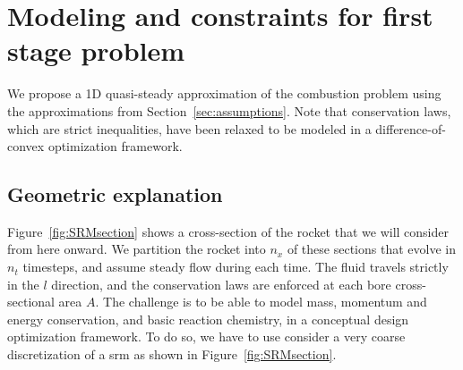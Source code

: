 \section{Modeling and constraints for first stage problem}

We propose a 1D quasi-steady approximation of the combustion problem
using the approximations from Section~\ref{sec:assumptions}. Note
that conservation laws, which are strict inequalities,
have been relaxed to be modeled in a difference-of-convex
optimization framework.

\subsection{Geometric explanation}

Figure~\ref{fig:SRMsection} shows a cross-section of the rocket
that we will consider from here onward.
We partition the rocket into $n_x$ of these sections that evolve in $n_t$ timesteps,
and assume steady flow during each time. The fluid travels strictly
in the $l$ direction, and the conservation laws are enforced at
each bore cross-sectional area $A$. The challenge is to be able to model mass, momentum and energy conservation,
and basic reaction chemistry, in a conceptual design optimization framework. To do so,
we have to use consider a very coarse discretization of a \gls{srm} as shown in Figure~\ref{fig:SRMsection}.



